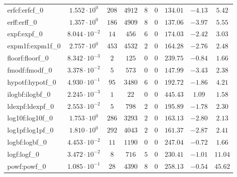 \begin{tabular}{|l|c|c|c|c|c|c|c|c|}
erfcf:erfcf\_0               & $ 1.552 \cdot 10^{0}  $ & $ 208    $ & $ 4912   $ & $ 8   $ & $ 0   $ & $ 134.01      $ & $ -4.13   $ & $ 5.42    $ \\
erff:erff\_0                 & $ 1.357 \cdot 10^{0}  $ & $ 186    $ & $ 4909   $ & $ 8   $ & $ 0   $ & $ 137.06      $ & $ -3.97   $ & $ 5.55    $ \\
expf:expf\_0                 & $ 8.044 \cdot 10^{-2} $ & $ 14     $ & $ 456    $ & $ 6   $ & $ 0   $ & $ 174.03      $ & $ -2.42   $ & $ 3.03    $ \\
expm1f:expm1f\_0             & $ 2.757 \cdot 10^{0}  $ & $ 453    $ & $ 4532   $ & $ 2   $ & $ 0   $ & $ 164.28      $ & $ -2.76   $ & $ 2.48    $ \\
floorf:floorf\_0             & $ 8.342 \cdot 10^{-3} $ & $ 2      $ & $ 125    $ & $ 0   $ & $ 0   $ & $ 239.75      $ & $ -0.84   $ & $ 1.66    $ \\
fmodf:fmodf\_0               & $ 3.378 \cdot 10^{-2} $ & $ 5      $ & $ 573    $ & $ 0   $ & $ 0   $ & $ 147.99      $ & $ -3.43   $ & $ 2.38    $ \\
hypotf:hypotf\_0             & $ 4.930 \cdot 10^{-1} $ & $ 95     $ & $ 3480   $ & $ 6   $ & $ 0   $ & $ 192.72      $ & $ -1.86   $ & $ 4.21    $ \\
ilogbf:ilogbf\_0             & $ 2.245 \cdot 10^{-3} $ & $ 1      $ & $ 22     $ & $ 0   $ & $ 0   $ & $ 445.43      $ & $ 1.09    $ & $ 1.58    $ \\
ldexpf:ldexpf\_0             & $ 2.553 \cdot 10^{-2} $ & $ 5      $ & $ 798    $ & $ 2   $ & $ 0   $ & $ 195.89      $ & $ -1.78   $ & $ 2.30    $ \\
log10f:log10f\_0             & $ 1.753 \cdot 10^{0}  $ & $ 286    $ & $ 3293   $ & $ 2   $ & $ 0   $ & $ 163.13      $ & $ -2.80   $ & $ 2.13    $ \\
log1pf:log1pf\_0             & $ 1.810 \cdot 10^{0}  $ & $ 292    $ & $ 4043   $ & $ 2   $ & $ 0   $ & $ 161.37      $ & $ -2.87   $ & $ 2.41    $ \\
logbf:logbf\_0               & $ 4.453 \cdot 10^{-2} $ & $ 11     $ & $ 1190   $ & $ 0   $ & $ 0   $ & $ 247.04      $ & $ -0.72   $ & $ 1.66    $ \\
logf:logf\_0                 & $ 3.472 \cdot 10^{-2} $ & $ 8      $ & $ 716    $ & $ 5   $ & $ 0   $ & $ 230.41      $ & $ -1.01   $ & $ 11.04   $ \\
powf:powf\_0                 & $ 1.085 \cdot 10^{-1} $ & $ 28     $ & $ 4390   $ & $ 8   $ & $ 0   $ & $ 258.13      $ & $ -0.54   $ & $ 45.62   $ \\

\end{tabular}
